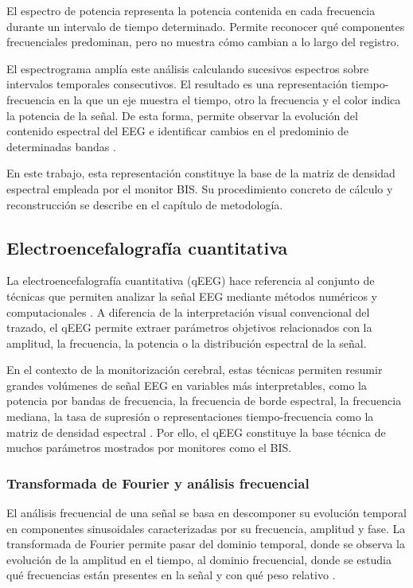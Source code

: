 \documentclass[
  spanish,
  a4paper,
  12pt,
  twoside]{memoir}
\begin{document}
El espectro de potencia representa la potencia contenida en cada
frecuencia durante un intervalo de tiempo determinado. Permite reconocer
qué componentes frecuenciales predominan, pero no muestra cómo cambian a
lo largo del registro.

El espectrograma amplía este análisis calculando sucesivos espectros
sobre intervalos temporales consecutivos. El resultado es una
representación tiempo-frecuencia en la que un eje muestra el tiempo,
otro la frecuencia y el color indica la potencia de la señal. De esta
forma, permite observar la evolución del contenido espectral del EEG e
identificar cambios en el predominio de determinadas bandas
\citep{Ng2022}.

En este trabajo, esta representación constituye la base de la matriz de
densidad espectral empleada por el monitor BIS. Su procedimiento
concreto de cálculo y reconstrucción se describe en el capítulo de
metodología.

\subsection{Electroencefalografía
cuantitativa}\label{electroencefalografuxeda-cuantitativa}

La electroencefalografía cuantitativa (qEEG) hace referencia al conjunto
de técnicas que permiten analizar la señal EEG mediante métodos
numéricos y computacionales \citep{Hwang2022}. A diferencia de la
interpretación visual convencional del trazado, el qEEG permite extraer
parámetros objetivos relacionados con la amplitud, la frecuencia, la
potencia o la distribución espectral de la señal.

En el contexto de la monitorización cerebral, estas técnicas permiten
resumir grandes volúmenes de señal EEG en variables más interpretables,
como la potencia por bandas de frecuencia, la frecuencia de borde
espectral, la frecuencia mediana, la tasa de supresión o
representaciones tiempo-frecuencia como la matriz de densidad espectral
\citep{Hwang2022, Ng2022}. Por ello, el qEEG constituye la base técnica
de muchos parámetros mostrados por monitores como el BIS.

\subsubsection{Transformada de Fourier y análisis
frecuencial}\label{transformada-de-fourier-y-anuxe1lisis-frecuencial}

El análisis frecuencial de una señal se basa en descomponer su evolución
temporal en componentes sinusoidales caracterizadas por su frecuencia,
amplitud y fase. La transformada de Fourier permite pasar del dominio
temporal, donde se observa la evolución de la amplitud en el tiempo, al
dominio frecuencial, donde se estudia qué frecuencias están presentes en
la señal y con qué peso relativo \citep{OppenheimSchafer2014}.
\end{document}
